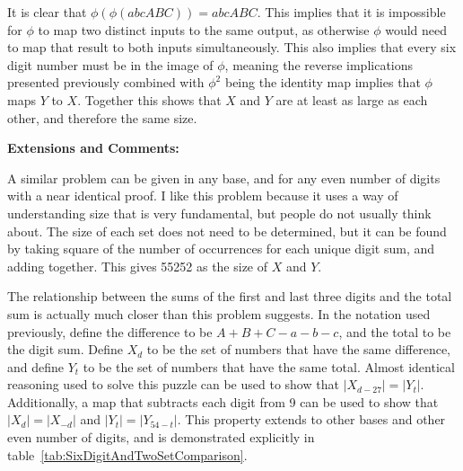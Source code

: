 It is clear that $\phi(\phi(abcABC)) = abcABC$. This implies that it is impossible for $\phi$ to map two distinct inputs to the same output, as otherwise $\phi$ would need to map that result to both inputs simultaneously. This also implies that every six digit number must be in the image of $\phi$, meaning the reverse implications presented previously combined with $\phi^2$ being the identity map implies that $\phi$ maps $Y$ to $X$. Together this shows that $X$ and $Y$ are at least as large as each other, and therefore the same size.

\textbf{Extensions and Comments:}

A similar problem can be given in any base, and for any even number of digits with a near identical proof. I like this problem because it uses a way of understanding size that is very fundamental, but people do not usually think about. The size of each set does not need to be determined, but it can be found by taking square of the number of occurrences for each unique digit sum, and adding together. This gives 55252 as the size of $X$ and $Y$.

The relationship between the sums of the first and last three digits and the total sum is actually much closer than this problem suggests. In the notation used previously, define the difference to be $A + B +C - a - b -c$, and the total to be the digit sum. Define $X_d$ to be the set of numbers that have the same difference, and define $Y_t$ to be the set of numbers that have the same total. Almost identical reasoning used to solve this puzzle can be used to show that $|X_{d-27}| = |Y_t|$. Additionally, a map that subtracts each digit from 9 can be used to show that $|X_d| = |X_{-d}|$ and $|Y_t| = |Y_{54 - t}|$. This property extends to other bases and other even number of digits, and is demonstrated explicitly in table~\ref{tab:SixDigitAndTwoSetComparison}.

